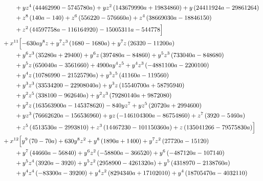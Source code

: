 \begin{align*}
&\qquad + y z^{4} \left(44462990 - 5745780 a\right) + y z^{2} \left(143679990 a + 19834860\right) + y \left(24411924 a - 29861264\right)\\
&\qquad + z^{8} \left(140 a - 140\right) + z^{6} \left(556220 - 576660 a\right) + z^{4} \left(38669030 a - 18846150\right)\\
&\qquad + z^{2} \left(44597758 a - 116164920\right) - 15005311 a - 544778\Bigr]\\
&{}+x^{11}\Bigl[- 630 a y^{8} z + y^{7} z^{3} \left(1680 - 1680 a\right) + y^{7} z \left(26320 - 11200 a\right)\\
&\qquad + y^{6} z^{3} \left(35280 a + 29400\right) + y^{6} z \left(397480 a - 84860\right) + y^{5} z^{3} \left(733040 a - 848680\right)\\
&\qquad + y^{5} z \left(650040 a - 3561660\right) + 4900 a y^{4} z^{5} + y^{4} z^{3} \left(- 4881100 a - 2200100\right)\\
&\qquad + y^{4} z \left(10786990 - 21525790 a\right) + y^{3} z^{5} \left(41160 a - 119560\right)\\
&\qquad + y^{3} z^{3} \left(33534200 - 22908040 a\right) + y^{3} z \left(15540700 a + 58795940\right)\\
&\qquad + y^{2} z^{5} \left(338100 - 962640 a\right) + y^{2} z^{3} \left(79280140 a + 9872080\right)\\
&\qquad + y^{2} z \left(163563900 a - 145378620\right) - 840 y z^{7} + y z^{5} \left(20720 a + 2994600\right)\\
&\qquad + y z^{3} \left(76662620 a - 156536960\right) + y z \left(- 146104300 a - 86754860\right) + z^{7} \left(3920 - 5460 a\right)\\
&\qquad + z^{5} \left(4513530 a - 2993810\right) + z^{3} \left(14467230 - 101150360 a\right) + z \left(135041266 - 79575830 a\right)\Bigr]\\
&{}+x^{12}\Bigl[y^{9} \left(70 - 70 a\right) + 630 y^{8} z^{2} + y^{8} \left(1890 a + 1400\right) + y^{7} z^{2} \left(27720 a - 15120\right)\\
&\qquad + y^{7} \left(44660 a - 56840\right) + y^{6} z^{2} \left(- 58800 a - 366520\right) + y^{6} \left(- 487120 a - 107140\right)\\
&\qquad + y^{5} z^{4} \left(3920 a - 3920\right) + y^{5} z^{2} \left(2958900 - 4261320 a\right) + y^{5} \left(4318970 - 2138760 a\right)\\
&\qquad + y^{4} z^{4} \left(- 83300 a - 39200\right) + y^{4} z^{2} \left(8294340 a + 17102010\right) + y^{4} \left(18705470 a - 4032110\right)\\

\end{align*}
